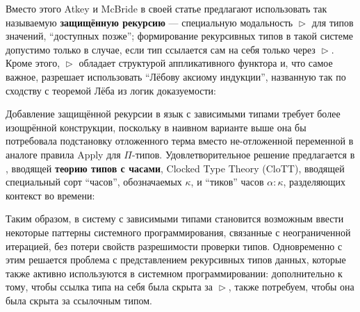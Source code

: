 \documentclass[12pt]{article}
\DeclareMathOperator{\ctx}{ctx}
\DeclareMathOperator{\later}{\triangleright}
\DeclareMathOperator{\tick}{\diamond}
\begin{document}
Вместо этого Atkey и McBride в своей статье \cite{atkey} предлагают использовать
так называемую \textbf{защищённую рекурсию} --- специальную модальность $\later$
для типов значений, ``доступных позже''; формирование рекурсивных типов в такой
системе допустимо только в случае, если тип ссылается сам на себя только через
$\later$. Кроме этого, $\later$ обладает структурой аппликативного функтора и,
что самое важное, разрешает использовать ``Лёбову аксиому индукции'', названную
так по сходству с теоремой Лёба из логик доказуемости:

Добавление защищённой рекурсии в язык с зависимыми типами требует более
изощрённой конструкции, поскольку в наивном варианте выше она бы потребовала
подстановку отложенного терма вместо не-отложенной переменной в аналоге правила
Apply для $\Pi$-типов. Удовлетворительное решение предлагается в \cite{clott},
вводящей \textbf{теорию типов с часами}, Clocked Type Theory (CloTT), вводящей
специальный сорт ``часов'', обозначаемых $\kappa$, и ``тиков'' часов
$\alpha:\kappa$, разделяющих контекст во времени:
Таким образом, в систему с зависимыми типами становится возможным ввести
некоторые паттерны системного программирования, связанные с неограниченной
итерацией, без потери свойств разрешимости проверки типов. Одновременно с этим
решается проблема с представлением рекурсивных типов данных, которые также
активно используются в системном программировании: дополнительно к тому, чтобы
ссылка типа на себя была скрыта за $\later$, также потребуем, чтобы она была
скрыта за ссылочным типом.
\end{document}
